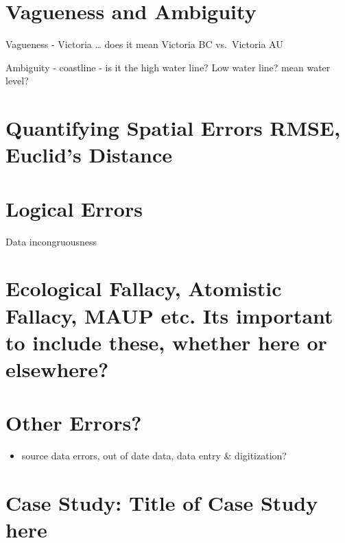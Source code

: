 \documentclass[
]{book}
\providecommand{\tightlist}{%
  \setlength{\itemsep}{0pt}\setlength{\parskip}{0pt}}
\begin{document}
\hypertarget{vagueness-and-ambiguity}{%
\section{Vagueness and Ambiguity}\label{vagueness-and-ambiguity}}

Vagueness - Victoria \ldots{} does it mean Victoria BC vs.~Victoria AU

Ambiguity - coastline - is it the high water line? Low water line? mean water level?

\hypertarget{quantifying-spatial-errors-rmse-euclids-distance}{%
\section{Quantifying Spatial Errors RMSE, Euclid's Distance}\label{quantifying-spatial-errors-rmse-euclids-distance}}

\hypertarget{logical-errors}{%
\section{Logical Errors}\label{logical-errors}}

Data incongruousness

\hypertarget{ecological-fallacy-atomistic-fallacy-maup-etc.-its-important-to-include-these-whether-here-or-elsewhere}{%
\section{Ecological Fallacy, Atomistic Fallacy, MAUP etc. Its important to include these, whether here or elsewhere?}\label{ecological-fallacy-atomistic-fallacy-maup-etc.-its-important-to-include-these-whether-here-or-elsewhere}}

\hypertarget{other-errors}{%
\section{Other Errors?}\label{other-errors}}

\begin{itemize}
\tightlist
\item
  source data errors, out of date data, data entry \& digitization?
\end{itemize}

\hypertarget{case-study-title-of-case-study-here-6}{%
\section{Case Study: Title of Case Study here}\label{case-study-title-of-case-study-here-6}}
\end{document}

